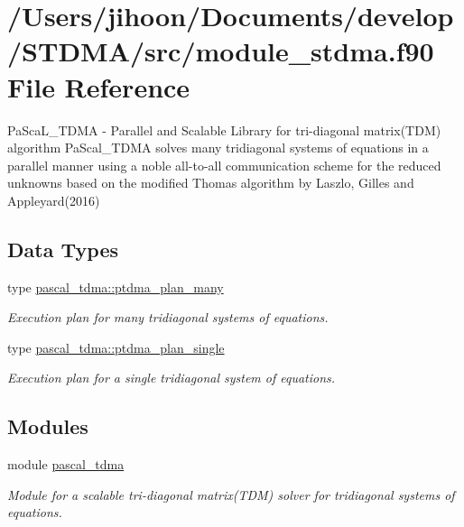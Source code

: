 \hypertarget{module__stdma_8f90}{}\section{/\+Users/jihoon/\+Documents/develop/\+S\+T\+D\+M\+A/src/module\+\_\+stdma.f90 File Reference}
\label{module__stdma_8f90}


Pa\+Sca\+L\+\_\+\+T\+D\+MA -\/ Parallel and Scalable Library for tri-\/diagonal matrix(\+T\+D\+M) algorithm Pa\+Scal\+\_\+\+T\+D\+MA solves many tridiagonal systems of equations in a parallel manner using a noble all-\/to-\/all communication scheme for the reduced unknowns based on the modified Thomas algorithm by Laszlo, Gilles and Appleyard(2016)  


\subsection*{Data Types}
\begin{DoxyCompactItemize}
\item 
type \mbox{\hyperlink{structpascal__tdma_1_1ptdma__plan__many}{pascal\+\_\+tdma\+::ptdma\+\_\+plan\+\_\+many}}
\begin{DoxyCompactList}\small\item\em Execution plan for many tridiagonal systems of equations. \end{DoxyCompactList}\item 
type \mbox{\hyperlink{structpascal__tdma_1_1ptdma__plan__single}{pascal\+\_\+tdma\+::ptdma\+\_\+plan\+\_\+single}}
\begin{DoxyCompactList}\small\item\em Execution plan for a single tridiagonal system of equations. \end{DoxyCompactList}\end{DoxyCompactItemize}
\subsection*{Modules}
\begin{DoxyCompactItemize}
\item 
module \mbox{\hyperlink{namespacepascal__tdma}{pascal\+\_\+tdma}}
\begin{DoxyCompactList}\small\item\em Module for a scalable tri-\/diagonal matrix(\+T\+D\+M) solver for tridiagonal systems of equations. \end{DoxyCompactList}\end{DoxyCompactItemize}
